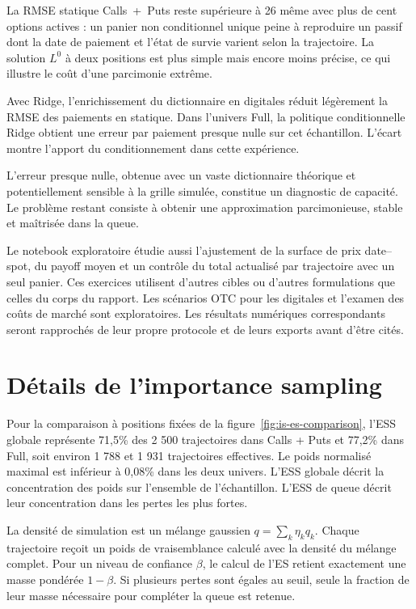 \documentclass[12pt,a4paper]{article}
\newcommand{\1}{\mathbf{1}}
\begin{document}
La RMSE statique Calls~+~Puts reste supérieure à 26 même avec plus de cent options actives : un panier non conditionnel unique peine à reproduire un passif dont la date de paiement et l'état de survie varient selon la trajectoire. La solution $L^0$ à deux positions est plus simple mais encore moins précise, ce qui illustre le coût d'une parcimonie extrême.

Avec Ridge, l’enrichissement du dictionnaire en digitales réduit légèrement la RMSE des paiements en statique. Dans l’univers Full, la politique conditionnelle Ridge obtient une erreur par paiement presque nulle sur cet échantillon. L’écart montre l’apport du conditionnement dans cette expérience.

L'erreur presque nulle, obtenue avec un vaste dictionnaire théorique et potentiellement sensible à la grille simulée, constitue un diagnostic de capacité. Le problème restant consiste à obtenir une approximation parcimonieuse, stable et maîtrisée dans la queue.

Le notebook exploratoire étudie aussi l'ajustement de la surface de prix date--spot, du payoff moyen et un contrôle du total actualisé par trajectoire avec un seul panier. Ces exercices utilisent d'autres cibles ou d'autres formulations que celles du corps du rapport. Les scénarios OTC pour les digitales et l'examen des coûts de marché sont exploratoires. Les résultats numériques correspondants seront rapprochés de leur propre protocole et de leurs exports avant d'être cités.



\section{Détails de l'importance sampling}\label{app:is}

Pour la comparaison à positions fixées de la figure~\ref{fig:is-es-comparison}, l’ESS globale représente 71,5\% des 2 500 trajectoires dans Calls + Puts et 77,2\% dans Full, soit environ 1 788 et 1 931 trajectoires effectives. Le poids normalisé maximal est inférieur à 0,08\% dans les deux univers. L’ESS globale décrit la concentration des poids sur l’ensemble de l’échantillon. L’ESS de queue décrit leur concentration dans les pertes les plus fortes.

La densité de simulation est un mélange gaussien $q=\sum_k\eta_kq_k$. Chaque trajectoire reçoit un poids de vraisemblance calculé avec la densité du mélange complet. Pour un niveau de confiance $\beta$, le calcul de l’ES retient exactement une masse pondérée $1-\beta$. Si plusieurs pertes sont égales au seuil, seule la fraction de leur masse nécessaire pour compléter la queue est retenue.
\end{document}
